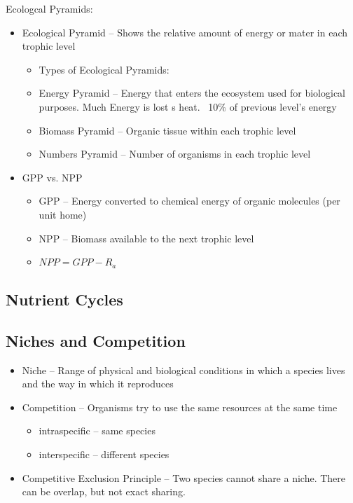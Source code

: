 \documentclass{article}
\begin{document}
Ecologcal Pyramids:
\begin{itemize}
\item Ecological Pyramid -- Shows the relative amount of energy or mater in each trophic level
\begin{itemize}
\item Types of Ecological Pyramids:
\item Energy Pyramid -- Energy that enters the ecosystem used for biological purposes. Much Energy is lost s heat. ~10\% of previous level's energy
\item Biomass Pyramid -- Organic tissue within each trophic level
\item Numbers Pyramid -- Number of organisms in each trophic level
\end{itemize}
\item GPP vs. NPP
\begin{itemize}
\item GPP -- Energy converted to chemical energy of organic molecules (per unit home)%
\item NPP -- Biomass available to the next trophic level
\item $NPP=GPP-R_a$
\end{itemize}
\end{itemize}

\subsection{Nutrient Cycles}

\subsection{Niches and Competition}
\begin{itemize}
\item Niche -- Range of physical and biological conditions in which a species lives and the way in which it reproduces
\item Competition -- Organisms try to use the same resources at the same time
\begin{itemize}
\item intraspecific -- same species
\item interspecific -- different species
\end{itemize}
\item Competitive Exclusion Principle -- Two species cannot share a niche. There can be overlap, but not exact sharing.
\end{itemize}
\end{document}
